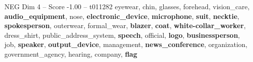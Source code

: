 \begin{textsample}{NEG Dim 4 – Score -1.00 – t011282}  \label{ex:f4_neg_039}
eyewear, chin, glasses, forehead, vision\_care, \textbf{audio\_equipment}, nose, \textbf{electronic\_device}, \textbf{microphone}, \textbf{suit}, \textbf{necktie}, \textbf{spokesperson}, outerwear, formal\_wear, \textbf{blazer}, \textbf{coat}, \textbf{white-collar\_worker}, dress\_shirt, public\_address\_system, \textbf{speech}, official, \textbf{logo}, \textbf{businessperson}, job, \textbf{speaker}, \textbf{output\_device}, management, \textbf{news\_conference}, organization, government\_agency, hearing, company, \textbf{flag}

\end{textsample}
